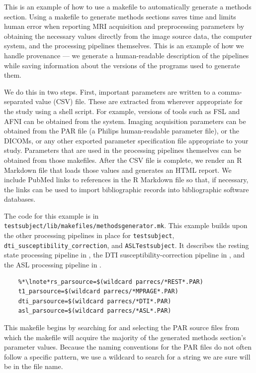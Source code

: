 \label{sec:provenance}
This is an example of how to use a makefile to automatically generate a methods section. Using a makefile to generate methods sections saves time and limits human error when reporting MRI acquisition and preprocessing parameters by obtaining the necessary values directly from the image source data, the computer system, and the processing pipelines themselves. This is an example of how we handle provenance --- we generate a human-readable description of the pipelines while saving information about the versions of the programs used to generate them. 

We do this in two steps. First, important parameters are written to a comma-separated value (CSV) file. These are extracted from wherever appropriate for the study using a \bashn{} shell script. For example, versions of tools such as FSL and AFNI can be obtained from the system. Imaging acquisition parameters can be obtained from the PAR file (a Philips human-readable parameter file), or the DICOMs, or any other exported parameter specification file appropriate to your study. Parameters that are used in the processing pipelines themselves can be obtained from those makefiles. After the CSV file is complete, we render an R Markdown file that loads those values and generates an HTML report. We include PubMed links to references in the R Markdown file so that, if necessary, the links can be used to import bibliographic records into bibliographic software databases. 

The code for this example is in \texttt{testsubject/lib/makefiles/methodsgenerator.mk}.  This example builds upon the other processing pipelines in place for \texttt{testsubject}, \texttt{dti_susceptibility_correction}, and \texttt{ASLTestsubject}. It describes the resting state processing pipeline in , the DTI susceptibility-correction pipeline in , and the ASL processing pipeline in .

\begin{lstlisting}
	%*\lnote*rs_parsource=$(wildcard parrecs/*REST*.PAR)
	t1_parsource=$(wildcard parrecs/*MPRAGE*.PAR)
	dti_parsource=$(wildcard parrecs/*DTI*.PAR)
	asl_parsource=$(wildcard parrecs/*ASL*.PAR)
\end{lstlisting}

This makefile begins by  searching for and selecting the PAR source files from which the makefile will acquire the majority of the generated methods section's parameter values. Because the naming conventions for the PAR files do not often follow a specific pattern, we use a wildcard to search for a string we are sure will be in the file name. 

